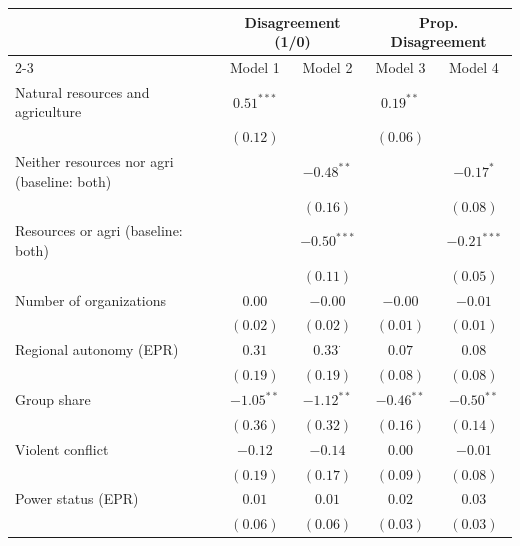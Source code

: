 
\begin{tabular}{l c c c c}
\hline
 & \multicolumn{2}{c}{Disagreement (1/0)} & \multicolumn{2}{c}{Prop. Disagreement} \\
\cline{2-3} \cline{4-5}
 & Model 1 & Model 2 & Model 3 & Model 4 \\
\hline
Natural resources and agriculture           & $0.51^{***}$ &                & $0.19^{**}$  &               \\
                                            & $(0.12)$     &                & $(0.06)$     &               \\
Neither resources nor agri (baseline: both) &              & $-0.48^{**}$   &              & $-0.17^{*}$   \\
                                            &              & $(0.16)$       &              & $(0.08)$      \\
Resources or agri (baseline: both)          &              & $-0.50^{***}$  &              & $-0.21^{***}$ \\
                                            &              & $(0.11)$       &              & $(0.05)$      \\
Number of organizations                     & $0.00$       & $-0.00$        & $-0.00$      & $-0.01$       \\
                                            & $(0.02)$     & $(0.02)$       & $(0.01)$     & $(0.01)$      \\
Regional autonomy (EPR)                     & $0.31$       & $0.33^{\cdot}$ & $0.07$       & $0.08$        \\
                                            & $(0.19)$     & $(0.19)$       & $(0.08)$     & $(0.08)$      \\
Group share                                 & $-1.05^{**}$ & $-1.12^{**}$   & $-0.46^{**}$ & $-0.50^{**}$  \\
                                            & $(0.36)$     & $(0.32)$       & $(0.16)$     & $(0.14)$      \\
Violent conflict                            & $-0.12$      & $-0.14$        & $0.00$       & $-0.01$       \\
                                            & $(0.19)$     & $(0.17)$       & $(0.09)$     & $(0.08)$      \\
Power status (EPR)                          & $0.01$       & $0.01$         & $0.02$       & $0.03$        \\
                                            & $(0.06)$     & $(0.06)$       & $(0.03)$     & $(0.03)$      \\

\end{tabular}
